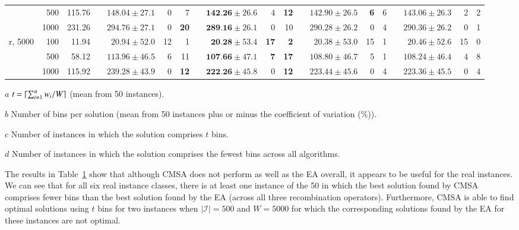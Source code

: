 \documentclass[a4paper,11pt,authoryear]{elsarticle}
\begin{document}
\begin{table}[h]
\begin{threeparttable}
{\begin{tabular}{crr c rrr c rrr c rrr c rrr}
	& 500 & 115.76 && $148.04 \pm 27.1$ & 0 & 7 && $\textbf{142.26} \pm 26.6$ & 4 & \textbf{12} && $142.90 \pm 26.5$ & \textbf{6} & 6 && $143.06 \pm 26.3$ & 2 & 2 \\
	& 1000 & 231.26 && $294.76 \pm 27.1$ & 0 & \textbf{20} && $\textbf{289.16} \pm 26.1$ & 0 & 10 && $290.28 \pm 26.2$ & 0 & 4 && $290.36 \pm 26.2$ & 0 & 1 \\
	\midrule
	r, 5000 & 100 & 11.94 && $20.94 \pm 52.0$ & 12 & 1 && $\textbf{20.28} \pm 53.4$ & \textbf{17} & \textbf{2} && $20.38 \pm 53.0$ & 15 & 1 && $20.46 \pm 52.6$ & 15 & 0 \\
	& 500 & 58.12 && $113.96 \pm 46.5$ & 6 & 11 && $\textbf{107.66} \pm 47.1$ & \textbf{7} & \textbf{17} && $108.80 \pm 46.7$ & 5 & 1 && $108.24 \pm 46.4$ & 4 & 8 \\		
	& 1000 & 115.92 && $239.28 \pm 43.9$ & 0 & \textbf{12} && $\textbf{222.26} \pm 45.8$ & 0 & \textbf{12} && $223.44 \pm 45.6$ & 0 & 4 && $223.36 \pm 45.5$ & 0 & 4\\
	\bottomrule
\end{tabular}}	
\vspace{0.2cm} %
\begin{tablenotes}
	\tiny
	\item[$a$] $t = \lceil\sum_{i=1}^{n} w_i / W\rceil$ (mean from 50 instances).
	\item[$b$] Number of bins per solution (mean from 50 instances plus or minus the coefficient of variation (\%)).
	\item[$c$] Number of instances in which the solution comprises $t$ bins.
	\item[$d$] Number of instances in which the solution comprises the fewest bins across all algorithms.
\end{tablenotes}
\end{threeparttable}
\label{table:cmsa}
\end{table}

The results in Table~\ref{table:cmsa} show that although CMSA does not perform as well as the EA overall, it appears to be useful for the real instances. We can see that for all six real instance classes, there is at least one instance of the 50 in which the best solution found by CMSA comprises fewer bins than the best solution found by the EA (across all three recombination operators). Furthermore, CMSA is able to find optimal solutions using $t$ bins for two instances when $|\mathcal{I}| = 500$ and $W = 5000$ for which the corresponding solutions found by the EA for these instances are not optimal. 
\end{document}
